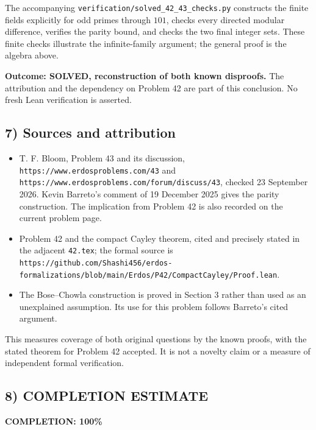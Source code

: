 The accompanying \texttt{verification/solved\_42\_43\_checks.py}
constructs the finite fields explicitly for odd primes through $101$,
checks every directed modular difference, verifies the parity bound,
and checks the two final integer sets. These finite checks illustrate
the infinite-family argument; the general proof is the algebra above.

\textbf{Outcome: SOLVED, reconstruction of both known disproofs.}
The attribution and the dependency on Problem 42 are part of this
conclusion. No fresh Lean verification is asserted.

\subsection{7) Sources and attribution}
\begin{itemize}
\item T. F. Bloom, Problem 43 and its discussion,
\texttt{https://www.erdosproblems.com/43} and
\texttt{https://www.erdosproblems.com/forum/discuss/43}, checked
23 September 2026. Kevin Barreto's comment of 19 December 2025 gives
the parity construction. The implication from Problem 42 is also
recorded on the current problem page.
\item Problem 42 and the compact Cayley theorem, cited and precisely
stated in the adjacent \texttt{42.tex}; the formal source is
\texttt{https://github.com/Shashi456/erdos-formalizations/blob/main/Erdos/P42/CompactCayley/Proof.lean}.
\item The Bose--Chowla construction is proved in Section 3 rather than
used as an unexplained assumption. Its use for this problem follows
Barreto's cited argument.
\end{itemize}

This measures coverage of both original questions by the known proofs,
with the stated theorem for Problem 42 accepted. It is not a novelty
claim or a measure of independent formal verification.
\subsection{8) COMPLETION ESTIMATE}
\textbf{COMPLETION: 100\%}
